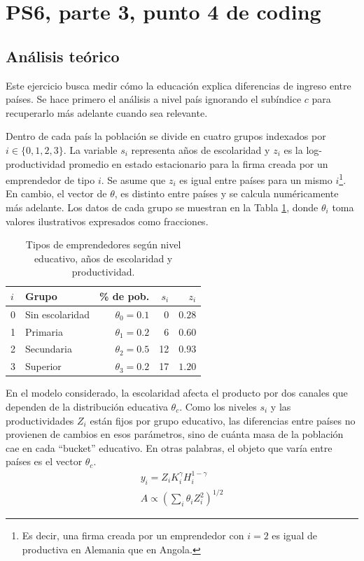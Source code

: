 \section{PS6, parte 3, punto 4 de coding}

\subsection{Análisis teórico}

Este ejercicio busca medir cómo la educación explica diferencias de ingreso entre países. Se hace primero el análisis a nivel país ignorando el subíndice $c$ para recuperarlo más adelante cuando sea relevante.

Dentro de cada país la población se divide en cuatro grupos indexados por $i \in \{0,1,2,3\}$. La variable $s_i$ representa años de escolaridad y $z_i$ es la log-productividad promedio en estado estacionario para la firma creada por un emprendedor de tipo $i$. Se asume que $z_i$ es igual entre países para un mismo $i$\footnote{Es decir, una firma creada por un emprendedor con $i=2$ es igual de productiva en Alemania que en Angola.}. En cambio, el vector de $\theta$, es distinto entre países y se calcula numéricamente más adelante. Los datos de cada grupo se muestran en la Tabla \ref{tab:empren}, donde $\theta_i$ toma valores ilustrativos expresados como fracciones.
\begin{table}[H]
	\centering
	\begin{tabular}{llrrr}
		\toprule
		$i$ & Grupo & \% de pob. & $s_i$ & $z_i$ \\
		\midrule
		0 & Sin escolaridad & $\theta_0 = 0.1$ & 0  & $0.28$ \\
		1 & Primaria        & $\theta_1 = 0.2 $ & 6  & $0.60$ \\
		2 & Secundaria      & $\theta_2 = 0.5$ & 12 & $0.93$ \\
		3 & Superior        & $\theta_3 = 0.2$ & 17 & $1.20$ \\
		\bottomrule
	\end{tabular}
	
	\caption{Tipos de emprendedores según nivel educativo, años de escolaridad y productividad.}
	\label{tab:empren}
\end{table}

En el modelo considerado, la escolaridad afecta el producto por dos canales que dependen de la distribución educativa $\theta_c$. Como los niveles $s_i$ y las productividades $Z_i$ están fijos por grupo educativo, las diferencias entre países no provienen de cambios en esos parámetros, sino de cuánta masa de la población cae en cada ``bucket'' educativo. En otras palabras, el objeto que varía entre países es el vector $\theta_c$.
\begin{align}
	y_i = Z_i K_i^\gamma H_i^{1-\gamma} \label{eq_y} \\
	A \propto \left(\sum_i \theta_i Z_i^2 \right)^{1/2} \label{eq_A}
\end{align}

